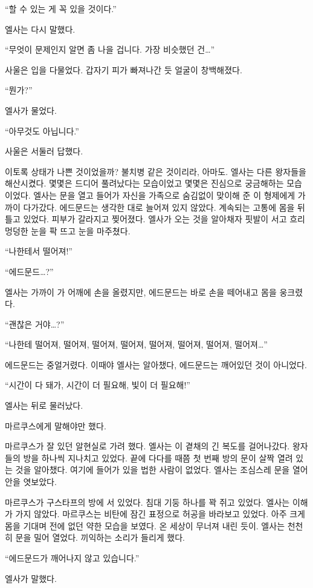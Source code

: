 ``할 수 있는 게 꼭 있을 것이다.''

엘사는 다시 말했다.

``무엇이 문제인지 알면 좀 나을 겁니다. 가장 비슷했던 건\ldots''

사울은 입을 다물었다. 갑자기 피가 빠져나간 듯 얼굴이 창백해졌다.

``뭔가?''

엘사가 물었다.

``아무것도 아닙니다.''

사울은 서둘러 답했다.

이토록 상태가 나쁜 것이었을까? 불치병 같은 것이리라, 아마도. 엘사는 다른 왕자들을 해산시켰다. 몇몇은 드디어 풀려났다는 모습이었고 몇몇은 진심으로 궁금해하는 모습이었다. 엘사는 문을 열고 들어가 자신을 가족으로 숨김없이 맞이해 준 이 형제에게 가까이 다가갔다. 에드문드는 생각한 대로 늘어져 있지 않았다. 계속되는 고통에 몸을 뒤틀고 있었다. 피부가 갈라지고 찢어졌다. 엘사가 오는 것을 알아채자 핏발이 서고 흐리멍덩한 눈을 팍 뜨고 눈을 마주쳤다.

``나한테서 떨어져!''

``에드문드\ldots?''

엘사는 가까이 가 어깨에 손을 올렸지만, 에드문드는 바로 손을 떼어내고 몸을 웅크렸다.

``괜찮은 거야\ldots?''

``나한테 떨어져, 떨어져, 떨어져, 떨어져, 떨어져, 떨어져, 떨어져, 떨어져\ldots''

에드문드는 중얼거렸다. 이때야 엘사는 알아챘다, 에드문드는 깨어있던 것이 아니었다.

``시간이 다 돼가, 시간이 더 필요해, 빛이 더 필요해!''

엘사는 뒤로 물러났다.

마르쿠스에게 말해야만 했다.

마르쿠스가 잘 있던 알현실로 가려 했다. 엘사는 이 곁채의 긴 복도를 걸어나갔다. 왕자들의 방을 하나씩 지나치고 있었다. 끝에 다다를 때쯤 첫 번째 방의 문이 살짝 열려 있는 것을 알아챘다. 여기에 들어가 있을 법한 사람이 없었다. 엘사는 조심스레 문을 열어 안을 엿보았다.

마르쿠스가 구스타프의 방에 서 있었다. 침대 기둥 하나를 꽉 쥐고 있었다. 엘사는 이해가 가지 않았다. 마르쿠스는 비탄에 잠긴 표정으로 허공을 바라보고 있었다. 아주 크게 몸을 기대며 전에 없던 약한 모습을 보였다. 온 세상이 무너져 내린 듯이. 엘사는 천천히 문을 밀어 열었다. 끼익하는 소리가 들리게 했다.

``에드문드가 깨어나지 않고 있습니다.''

엘사가 말했다.

